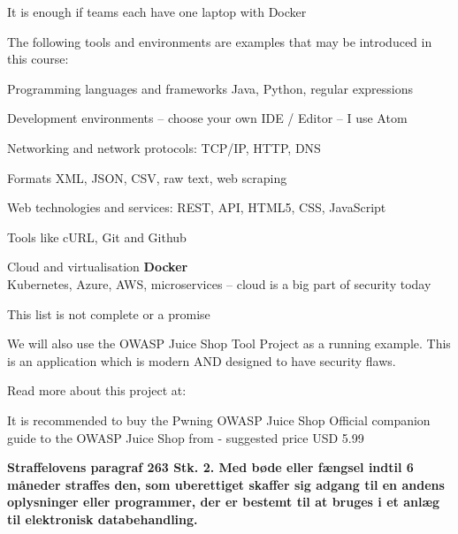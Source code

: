 \documentclass[Screen16to9,17pt]{foils}
\begin{document}
\centerline{It is enough if teams each have one laptop with Docker}



The following tools and environments are examples that may be introduced in this course:

\begin{list2}
\item Programming languages and frameworks Java, Python, regular expressions
\item Development environments -- choose your own IDE / Editor -- I use Atom
\item Networking and network protocols: TCP/IP, HTTP, DNS
\item Formats XML, JSON, CSV, raw text, web scraping
\item Web technologies and services: REST, API, HTML5, CSS, JavaScript
\item Tools like cURL, Git and Github
\item Cloud and virtualisation {\bf Docker}\\
Kubernetes, Azure, AWS, microservices -- cloud is a big part of security today
\end{list2}

\centerline{This list is not complete or a promise }



We will also use the OWASP Juice Shop Tool Project as a running example. This is an application which is modern AND designed to have security flaws.

Read more about this project at: \\ 

It is recommended to buy the Pwning OWASP Juice Shop Official companion guide to the OWASP Juice Shop from  - suggested price USD 5.99



\vskip 1cm
{\bfseries Straffelovens paragraf 263 Stk. 2. Med bøde eller fængsel
  indtil 6 måneder
straffes den, som uberettiget skaffer sig adgang til en andens
oplysninger eller programmer, der er bestemt til at bruges i et anlæg
til elektronisk databehandling.}
\end{document}
